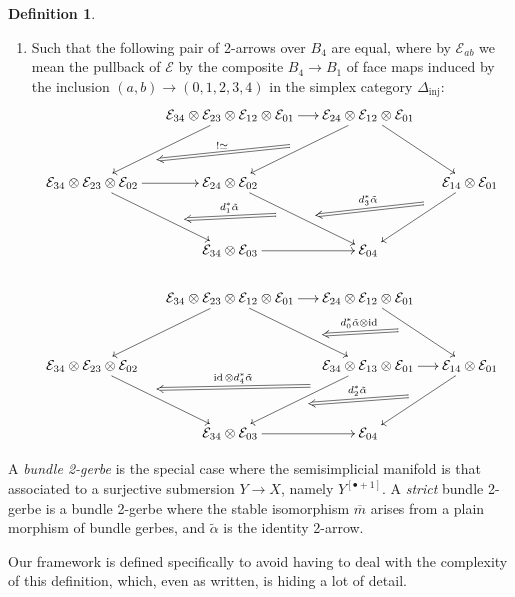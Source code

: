 \documentclass[12pt]{amsart}
\DeclareMathOperator{\id}{id}
\theoremstyle{plain}
\theoremstyle{definition}
\newtheorem{definition}[theorem]{Definition}
\theoremstyle{remark}
\numberwithin{equation}{section}
\newcommand{\cE}{{\mathcal E}}
\newcommand{\<}{\langle}
\renewcommand{\>}{\rangle}
\begin{document}
\begin{definition}
\begin{enumerate}
\item Such that the following pair of 2-arrows over $B_4$ are equal,  where by $\cE_{ab}$ we mean the pullback of $\cE$ by the composite $B_4\to B_1$ of face maps induced by the inclusion $(a,b) \to (0,1,2,3,4)$ in the simplex category $\Delta_{\mathrm{inj}}$: 
\begin{align*}
	\xymatrix@-1em{
		& \cE_{34}\otimes \cE_{23}\otimes \cE_{12}\otimes \cE_{01} \ar[r] \ar[ddl]^(0.6){\ }="t1" & \cE_{24}\otimes \cE_{12}\otimes \cE_{01}  \ar[ddl]_{\ }="s1" \ar[ddr] \\
		\\
		\cE_{34}\otimes \cE_{23}\otimes \cE_{02}  \ar[r] \ar[ddr]^(0.6){\ }="t3" & \cE_{24}\otimes \cE_{02} \ar[ddr]^(0.55){\ }="t2"_(0.4){\ }="s3" && \cE_{14}\otimes \cE_{01} \ar[ddl]_(0.35){\ }="s2"
		\\
		\\
		& \cE_{34}\otimes \cE_{03} \ar[r] & \cE_{04}
		\ar@{=>}"s1";"t1"_{!\simeq}
		\ar@{=>}"s2";"t2"_{d_3^*\tilde \alpha}
		\ar@{=>}"s3";"t3"_{d_1^*\tilde \alpha}
	}
	\\
	\\
	\xymatrix@-1em{
		& \cE_{34}\otimes \cE_{23}\otimes \cE_{12}\otimes \cE_{01}  \ar[r] \ar[ddl] \ar[ddr]^(0.6){\ }="t2" & \cE_{24}\otimes \cE_{12}\otimes \cE_{01}   \ar[ddr]_(0.4){\ }="s2" \\
		\\
		\cE_{34}\otimes \cE_{23}\otimes \cE_{02}  \ar[ddr]^(0.4){\ }="t1" && 
		\cE_{34}\otimes \cE_{13}\otimes \cE_{01}  \ar[r] \ar[ddl]_(0.35){\ }="s1"^{\ }="t3" & \cE_{14}\otimes \cE_{01} \ar[ddl]_{\ }="s3"\\
		\\
		& \cE_{34}\otimes \cE_{03} \ar[r] & \cE_{04}
		\ar@{=>}"s1";"t1"_{\id\otimes d_4^*\tilde \alpha}
		\ar@{=>}"s2";"t2"_{d_0^*\tilde \alpha\otimes\id}
		\ar@{=>}"s3";"t3"_{d_2^*\tilde \alpha}
	}
\end{align*}
\end{enumerate}
A \emph{bundle 2-gerbe} is the special case where the semisimplicial manifold is that associated to a surjective submersion $Y\to X$, namely $Y^{[\bullet+1]}$.
A \emph{strict} bundle 2-gerbe is a bundle 2-gerbe where the stable isomorphism $\overline{m}$ arises from a plain morphism of bundle gerbes, and $\tilde \alpha$ is the identity 2-arrow.
\end{definition}

Our framework is defined specifically to avoid having to deal with the complexity of this definition, which, even as written, is hiding a lot of detail.
\end{document}
